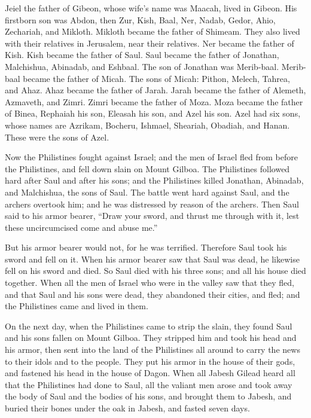 \myverse{}Jeiel the father of Gibeon, whose wife’s name was Maacah, lived
in Gibeon.
\myverse{}His firstborn son was Abdon, then Zur, Kish, Baal, Ner, Nadab,
\myverse{}Gedor, Ahio, Zechariah, and Mikloth.
\myverse{}Mikloth became the father of Shimeam. They also lived with their relatives
in Jerusalem, near their relatives.
\myverse{}Ner became the father of Kish. Kish became the father of Saul. Saul became
the father of Jonathan, Malchishua, Abinadab, and Eshbaal.
\myverse{}The son of Jonathan was Merib-baal. Merib-baal became the father of Micah.
\myverse{}The sons of Micah: Pithon, Melech, Tahrea, and Ahaz.
\myverse{}Ahaz became the father of Jarah. Jarah became the father of Alemeth, Azmaveth,
and Zimri. Zimri became the father of Moza.
\myverse{}Moza became the father of Binea, Rephaiah his son, Eleasah his son, and Azel
his son.
\myverse{}Azel had six sons, whose names are Azrikam, Bocheru, Ishmael, Sheariah, Obadiah,
and Hanan. These were the sons of Azel.


\mychapter{} \myverse*{}Now the Philistines fought against Israel; and the men of Israel
fled from before the Philistines, and fell down slain on Mount Gilboa.
\myverse{}The Philistines followed hard after Saul and after his sons; and the Philistines
killed Jonathan, Abinadab, and Malchishua, the sons of Saul.
\myverse{}The battle went hard against Saul, and the archers overtook him; and he was
distressed by reason of the archers.
\myverse{}Then Saul said to his armor bearer, “Draw your sword, and thrust me through
with it, lest these uncircumcised come and abuse me.”

But his armor bearer would not, for he was terrified. Therefore Saul took his sword and fell
on it.
\myverse{}When his armor bearer saw that Saul was dead, he likewise fell on his sword
and died.
\myverse{}So Saul died with his three sons; and all his house died together.
\myverse{}When all the men of Israel who were in the valley saw that they fled, and that
Saul and his sons were dead, they abandoned their cities, and fled; and the Philistines came and lived
in them.

\myverse{}On the next day, when the Philistines came to strip the slain,
they found Saul and his sons fallen on Mount Gilboa.
\myverse{}They stripped him and took his head and his armor, then sent into the land
of the Philistines all around to carry the news to their idols and to the people.
\myverse{}They put his armor in the house of their gods, and fastened his head in the
house of Dagon.
\myverse{}When all Jabesh Gilead heard all that the Philistines had done to Saul,
\myverse{}all the valiant men arose and took away the body of Saul and the bodies of
his sons, and brought them to Jabesh, and buried their bones under the oak in Jabesh, and fasted seven
days.

